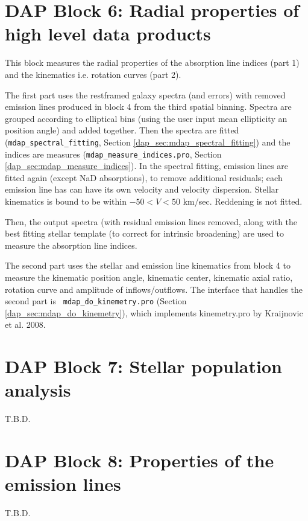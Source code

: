 \documentclass[11pt]{book}
\begin{document}
 

\section{DAP Block 6: Radial properties of high level data products}
\label{dap_sec:block6}

This block measures the radial properties of the absorption line
indices (part 1) and the kinematics i.e. rotation curves (part 2).

The first part uses the restframed galaxy spectra (and errors) with
removed emission lines produced in block 4 from the third spatial
binning. Spectra are grouped according to elliptical bins (using the
user input mean ellipticity an position angle) and added
together. Then the spectra are fitted ({\tt mdap\_spectral\_fitting},
Section \ref{dap_sec:mdap_spectral_fitting}) and the indices are
measures ({\tt mdap\_measure\_indices.pro}, Section
\ref{dap_sec:mdap_measure_indices}).  In the spectral fitting,
emission lines are fitted again (except NaD absorptions), to remove
additional residuals; each emission line has can have its own velocity
and velocity dispersion. Stellar kinematics is bound to be within $-50
< V < 50$ km/sec. Reddening is not fitted.

Then, the output spectra (with residual emission lines removed, along
with the best fitting stellar template (to correct for intrinsic
broadening) are used to measure the absorption line indices.

The second part uses the stellar and emission line kinematics from
block 4 to measure the kinematic position angle, kinematic center,
kinematic axial ratio, rotation curve and amplitude of
inflows/outflows. The interface that handles the second part is {\tt
  mdap\_do\_kinemetry.pro} (Section \ref{dap_sec:mdap_do_kinemetry}),
which implements kinemetry.pro by Kraijnovic et al. 2008.



\section{DAP Block 7: Stellar population analysis}
\label{dap_sec:block7}
T.B.D.

\section{DAP Block 8: Properties of the emission lines}
\label{dap_sec:block8}
T.B.D.
\end{document}
